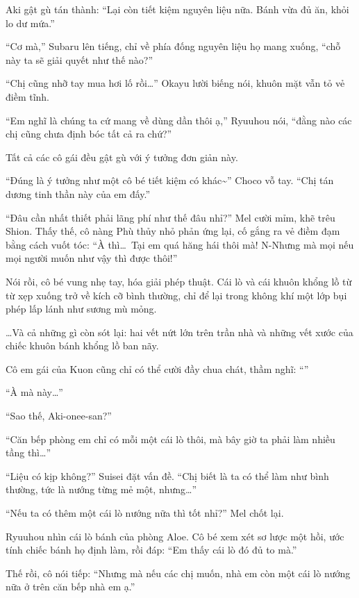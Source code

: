 \documentclass[../main.tex]{subfiles}
\begin{document}
Aki gật gù tán thành: ``Lại còn tiết kiệm nguyên liệu nữa. Bánh vừa đủ ăn, khỏi lo dư mứa.''

``Cơ mà,'' Subaru lên tiếng, chỉ về phía đống nguyên liệu họ mang xuống, ``chỗ này ta sẽ giải quyết như thế nào?''

``Chị cũng nhỡ tay mua hơi lố rồi\dots'' Okayu lười biếng nói, khuôn mặt vẫn tỏ vẻ điềm tĩnh.

``Em nghĩ là chúng ta cứ mang về dùng dần thôi ạ,'' Ryuuhou nói, ``đằng nào các chị cũng chưa định bóc tất cả ra chứ?''

Tất cả các cô gái đều gật gù với ý tưởng đơn giản này.

``Đúng là ý tưởng như một cô bé tiết kiệm có khác\~{}'' Choco vỗ tay. ``Chị tán dương tinh thần này của em đấy.''

``Đâu cần nhất thiết phải lãng phí như thế đâu nhỉ?'' Mel cười mỉm, khẽ trêu Shion. Thấy thế, cô nàng Phù thủy nhỏ phản ứng lại, cố gắng ra vẻ điềm đạm bằng cách vuốt tóc: ``À thì\dots\ Tại em quá hăng hái thôi mà! N-Nhưng mà mọi nếu mọi người muốn như vậy thì được thôi!''

Nói rồi, cô bé vung nhẹ tay, hóa giải phép thuật. Cái lò và cái khuôn khổng lồ từ từ xẹp xuống trở về kích cỡ bình thường, chỉ để lại trong không khí một lớp bụi phép lấp lánh như sương mù mỏng.

\dots Và cả những gì còn sót lại: hai vết nứt lớn trên trần nhà và những vết xước của chiếc khuôn bánh khổng lồ ban nãy.

Cô em gái của Kuon cũng chỉ có thể cười đầy chua chát, thầm nghĩ: ``''

\ct

``À mà này\dots''

``Sao thế, Aki-onee-san?''

``Căn bếp phòng em chỉ có mỗi một cái lò thôi, mà bây giờ ta phải làm nhiều tầng thì\dots''

``Liệu có kịp không?'' Suisei đặt vấn đề. ``Chị biết là ta có thể làm như bình thường, tức là nướng từng mẻ một, nhưng\dots''

``Nếu ta có thêm một cái lò nướng nữa thì tốt nhỉ?'' Mel chốt lại.

Ryuuhou nhìn cái lò bánh của phòng Aloe. Cô bé xem xét sơ lược một hồi, ước tính chiếc bánh họ định làm, rồi đáp: ``Em thấy cái lò đó đủ to mà.''

Thế rồi, cô nói tiếp: ``Nhưng mà nếu các chị muốn, nhà em còn một cái lò nướng nữa ở trên căn bếp nhà em ạ.''
\end{document}
